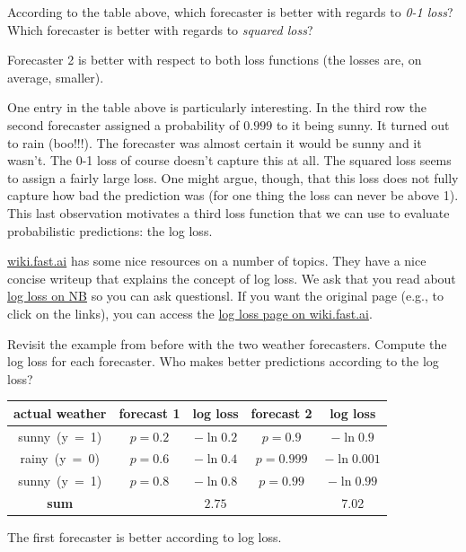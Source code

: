 \documentclass[assignment04_Solutions]{subfiles}
\begin{document}
\vspace{1em}

\begin{understandingcheck}
According to the table above, which forecaster is better with regards to \emph{0-1 loss}?  Which forecaster is better with regards to \emph{squared loss}?

\begin{boxedsolution}
Forecaster 2 is better with respect to both loss functions (the losses are, on average, smaller).
\end{boxedsolution}
\end{understandingcheck}

One entry in the table above is particularly interesting.  In the third row the second forecaster assigned a probability of $0.999$ to it being sunny.  It turned out to rain (boo!!!).  The forecaster was almost certain it would be sunny and it wasn't.  The 0-1 loss of course doesn't capture this at all.  The squared loss seems to assign a fairly large loss.  One might argue, though, that this loss does not fully capture how bad the prediction was (for one thing the loss can never be above 1).  This last observation motivates a third loss function that we can use to evaluate probabilistic predictions: the log loss.
\vspace{1em}
\begin{externalresources}[(30 minutes)]
\url{wiki.fast.ai} has some nice resources on a number of topics.  They have a nice concise writeup that explains the concept of log loss.  We ask that you read about \href{http://nb.mit.edu/f/55213}{log loss on NB} so you can ask questionsl.  If you want the original page (e.g., to click on the links), you can access the \href{http://wiki.fast.ai/index.php/Log_Loss}{log loss page on wiki.fast.ai}.
\begin{exercise}
Revisit the example from before with the two weather forecasters.  Compute the log loss for each forecaster.  Who makes better predictions according to the log loss?
\begin{boxedsolution}
\begin{center}
\small
\begin{tabular}{c | c | c | c | c }
\hline
actual weather & forecast 1 & log loss & forecast 2 & log loss \\
\hline
\mbox{sunny (y = 1)} & $p = 0.2$ & $-\ln 0.2$ & $p = 0.9$ &  $-\ln 0.9$\\
\mbox{rainy (y = 0)} & $p = 0.6$  &  $-\ln 0.4$ & $p = 0.999$ &  $-\ln 0.001$\\ 
\mbox{sunny (y = 1)} & $p = 0.8$ & $-\ln 0.8$ & $p = 0.99$ & $-\ln 0.99$\\
\hline
\textbf{sum} & & $2.75$ &  & 7.02
\end{tabular}
\end{center}
The first forecaster is better according to log loss.

\end{boxedsolution}

\end{exercise}
\end{externalresources}
\end{document}

